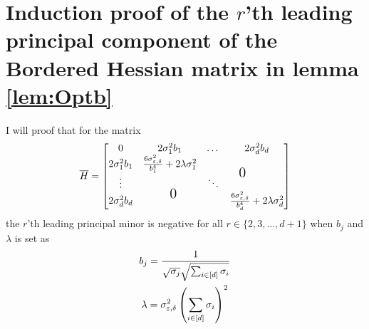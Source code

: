 \documentclass[a4paper,12pt]{article}
\begin{document}
\section{Induction proof of the $r$'th leading principal component of the Bordered Hessian matrix in lemma \ref{lem:Optb}}
\label{apx:inducproof}
I will proof that for the matrix
\[
    \overline{H} =
    \begin{bmatrix}
    0 & 2\sigma_1^2b_1 & \dots & 2 \sigma_d^2 b_d \\
    2\sigma_1^2b_1 & \frac{6\sigma_{\epsilon, \delta}^2}{b_1^4} + 2 \lambda \sigma_1^2 &  & \multirow{2.5}{0.5in}{\Large 0}  \\
    \vdots & \multirow{2.5}{-0.5in}{\Large 0}  & \ddots \\
    2\sigma_d^2b_d &  & & \frac{6\sigma_{\epsilon, \delta}^2}{b_d^4} + 2 \lambda \sigma_d^2 
    \end{bmatrix}
\]
the $r$'th leading principal minor is negative for all $r \in \{2,3, \dots, d+1\}$
when $b_j$ and $\lambda$ is set as
\begin{gather*}
b_j = \frac{1}{\sqrt{\sigma_j} \sqrt{\sum_{i \in [d]} \sigma_i}} \\
\lambda  = \sigma_{\varepsilon,\delta}^2 \left ( \sum_{i \in [d]} \sigma_i\right)^2
\end{gather*}
\end{document}
